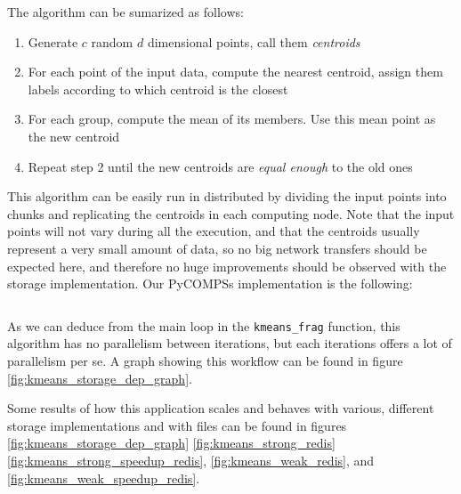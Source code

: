 The algorithm can be sumarized as follows:

\begin{enumerate}
\item Generate $c$ random $d$ dimensional points, call them \textit{centroids}
\item For each point of the input data, compute the nearest centroid, assign them labels according to which centroid is the closest
\item For each group, compute the mean of its members. Use this mean point as the new centroid
\item Repeat step 2 until the new centroids are \textit{equal enough} to the old ones
\end{enumerate}

This algorithm can be easily run in distributed by dividing the input points into chunks and replicating the centroids in each computing node. Note that the input points will not vary during all the execution, and that the centroids usually represent a very small amount of data, so no big network transfers should be expected here, and therefore no huge improvements should be observed with the storage implementation. Our PyCOMPSs implementation is the following:

\inputminted{python}{snippets/kmeans_storage.py}

As we can deduce from the main loop in the \verb|kmeans_frag| function, this algorithm has no parallelism between iterations, but each iterations offers a lot of parallelism per se. A graph showing this workflow can be found in figure \ref{fig:kmeans_storage_dep_graph}.


Some results of how this application scales and behaves with various, different storage implementations and with files can be found in figures \ref{fig:kmeans_storage_dep_graph} \ref{fig:kmeans_strong_redis} \ref{fig:kmeans_strong_speedup_redis}, \ref{fig:kmeans_weak_redis}, and \ref{fig:kmeans_weak_speedup_redis}.

